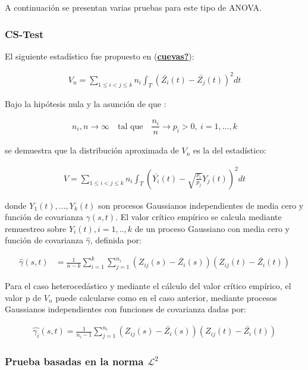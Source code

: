 \documentclass[
]{book}
\begin{document}
A continuación se presentan varias pruebas para este tipo de ANOVA.

\hypertarget{cs-test}{%
\subsubsection*{CS-Test}\label{cs-test}}

El siguiente estadístico fue propuesto en (\protect\hyperlink{ref-cuevas}{\textbf{cuevas?}}):

\begin{align}
    V_n=\sum_{1\leq i<j\leq k} n_i\int_T ({\bar{Z_i}}(t)-{\bar{Z_j}}(t))^2dt
\end{align}

Bajo la hipótesis nula y la asunción de que :

\begin{align}
 n_i,n \to \infty \quad \text{tal que}\quad  \dfrac{n_i}{n}\to p_i >0,\ i=1,...,k
\end{align}

se demuestra que la distribución aproximada de \(V_n\) es la del estadístico:

\begin{align}
    V=\sum_{1\leq i<j\leq k} n_i\int_T \left(\bar{Y_i}(t)-\sqrt{\frac{p_i}{p_j}}Y_j(t)\right)^2dt
\end{align}

donde \(Y_1(t),...,Y_k(t)\) son procesos Gaussianos independientes de media cero y función de covarianza \(\gamma(s,t)\). El valor crítico empírico se calcula mediante remuestreo sobre \(Y_i(t),i=1,..,k\) de un proceso Gaussiano con media cero y función de covarianza \({\hat{\gamma}}\), definida por:

\begin{align}
    {\hat{\gamma}}(s,t)&=\frac{1}{n-k}\sum_{i=1}^k\sum_{j=1}^{n_i}(Z_{ij}(s)-\bar{Z_i}(s))(Z_{ij}(t)-\bar{Z_i}(t))
\end{align}

Para el caso heterocedástico y mediante el cálculo del valor crítico empírico, el valor p de \(V_n\) puede calcularse como en el caso anterior, mediante procesos Gaussianos independientes con funciones de covarianza dadas por:

\begin{align}
    {\hat{\gamma_i}}(s,t)=\frac{1}{n_i-1}\sum_{j=1}^{n_i}(Z_{ij}(s)-\bar{Z_i}(s))(Z_{ij}(t)-\bar{Z_i}(t))
\end{align}

\hypertarget{prueba-basadas-en-la-norma-mathcall2}{%
\subsubsection*{\texorpdfstring{Prueba basadas en la norma \(\mathcal{L}^2\)}{Prueba basadas en la norma \textbackslash mathcal\{L\}\^{}2}}\label{prueba-basadas-en-la-norma-mathcall2}}
\end{document}
